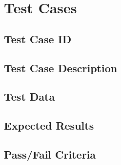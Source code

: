 \chapter{Test Cases}

\section{ Test Case ID}
\section{Test Case Description}
\section{Test Data}
\section{ Expected Results}
\section{Pass/Fail Criteria}







